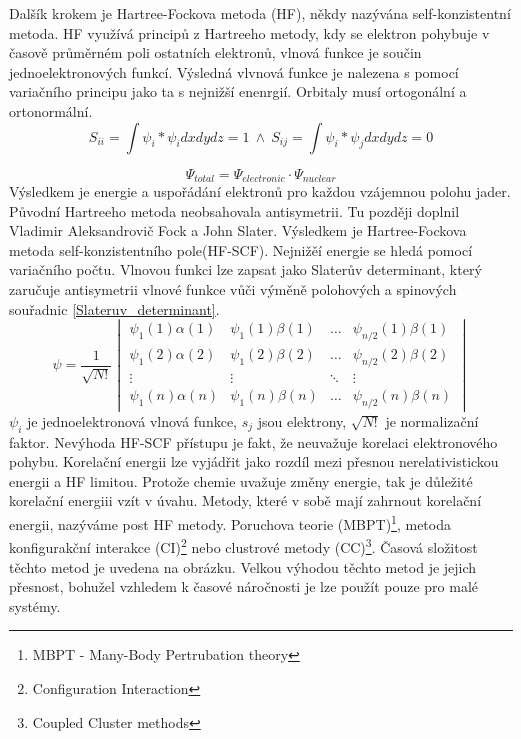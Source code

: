 \documentclass[
  digital, %
  table,   %
  lof,     %
  lot,     %
]{fithesis3}
\begin{document}
 Dalšík krokem je Hartree-Fockova metoda (HF), někdy nazývána self-konzistentní metoda. HF využívá principů z Hartreeho metody, kdy se elektron pohybuje v časově průměrném poli ostatních elektronů, vlnová funkce je součin jednoelektronových funkcí. Výsledná vlvnová funkce je nalezena s pomocí variačního principu jako ta s nejnižší enenrgií. Orbitaly musí ortogonální a ortonormální.
 \begin{equation}
 S_{ii} = \int \psi_i * \psi_i dx dy dz = 1 ~ \wedge ~ S_{ij} = \int \psi_i * \psi_j dx dy dz = 0
 \end{equation}

\begin{equation}
  \Psi_{total} = \Psi_{electronic} \cdot \Psi_{nuclear}
  \label{B_O_approximace}
\end{equation}
Výsledkem je energie a uspořádání elektronů pro každou vzájemnou polohu jader. Původní Hartreeho metoda neobsahovala antisymetrii. Tu později doplnil Vladimir Aleksandrovič Fock a John Slater. Výsledkem je Hartree-Fockova metoda self-konzistentního pole(HF-SCF). Nejnižěí energie se hledá pomocí variačního počtu. Vlnovou funkci lze zapsat jako Slaterův determinant, který zaručuje antisymetrii vlnové funkce vůči výměně polohových a spinových souřadnic \ref{Slateruv_determinant}.
\begin{equation}
\psi =  \frac{1}{\sqrt{N!}}\begin{vmatrix}
\psi_1(1)\alpha(1) & \psi_1(1) \beta (1)  & \dots & \psi_{n/2}(1)\beta(1) \\
\psi_1(2)\alpha(2) & \psi_1(2) \beta (2) & \dots & \psi_{n/2}(2)\beta(2) \\
\vdots             & \vdots                           & \ddots & \vdots \\
\psi_1(n)\alpha(n) & \psi_1(n) \beta (n) & \dots & \psi_{n/2}(n)\beta(n)
\end{vmatrix}
\label{Slateruv_determinant}
\end{equation}
$\psi_i$ je jednoelektronová vlnová funkce, $s_j$ jsou elektrony, $\sqrt{N!}$ je normalizační faktor.
 Nevýhoda HF-SCF přístupu je fakt, že neuvažuje korelaci elektronového pohybu. Korelační energii lze vyjádřit jako rozdíl mezi přesnou nerelativistickou energii a HF limitou. Protože chemie uvažuje změny energie, tak je důležité korelační energiii vzít v úvahu.
Metody, které v sobě mají zahrnout korelační energii, nazýváme post HF metody. Poruchova teorie (MBPT)\footnote{MBPT - Many-Body Pertrubation theory}, metoda konfigurakční interakce (CI)\footnote{Configuration Interaction} nebo clustrové metody (CC)\footnote{Coupled
Cluster methods}. Časová složitost těchto metod je uvedena na obrázku. Velkou výhodou těchto metod je jejich přesnost, bohužel vzhledem k časové náročnosti je lze použít pouze pro malé systémy.
\end{document}
